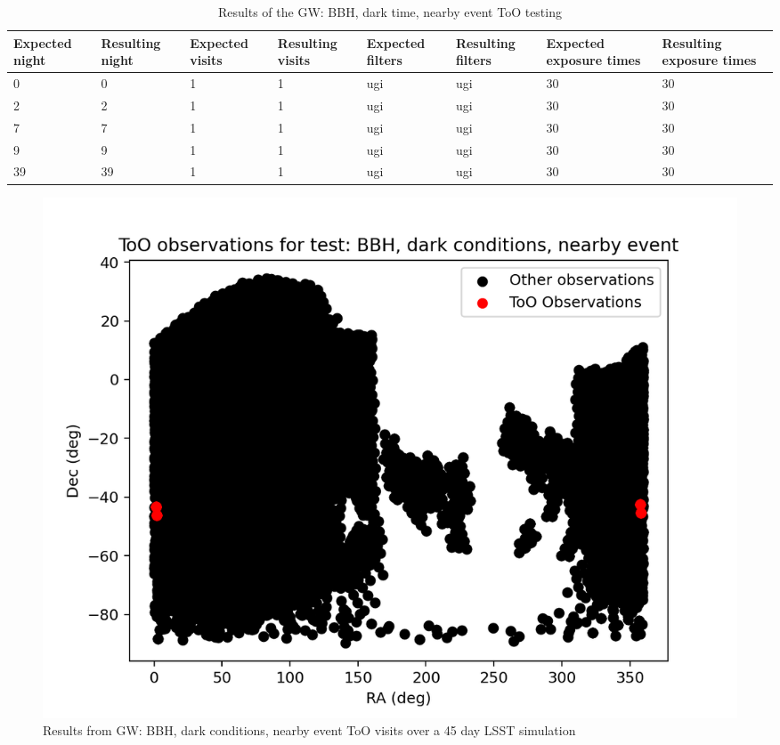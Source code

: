 \begin{table}[]
\centering
\begin{adjustbox}{max width=\textwidth}
\begin{tabular}{|l|l|l|l|l|l|l|l|}
\hline
Expected night & Resulting night & Expected visits & Resulting visits & Expected filters & Resulting filters & Expected exposure times & Resulting exposure times \\ \hline
0              & 0               & 1               & 1                & ugi              & ugi               & 30                      & 30                       \\ \hline
2              & 2               & 1               & 1                & ugi              & ugi               & 30                      & 30                       \\ \hline
7              & 7               & 1               & 1                & ugi              & ugi               & 30                      & 30                       \\ \hline
9              & 9               & 1               & 1                & ugi              & ugi               & 30                      & 30                       \\ \hline
39             & 39              & 1               & 1                & ugi              & ugi               & 30                      & 30                       \\ \hline
\end{tabular}
\end{adjustbox}
\caption{Results of the GW: BBH, dark time, nearby event ToO testing}
\label{tab:GWBBHDarkNearResults}
\end{table}

\begin{figure}
    \centering
    \includegraphics[width=\linewidth]{figures/validationTests/SVRequired/BBHDarkNearPosition.png}
    \caption{Results from GW: BBH, dark conditions, nearby event ToO visits over a 45 day LSST simulation}
    \label{fig:GWDarkNearPositionResult}
\end{figure}

